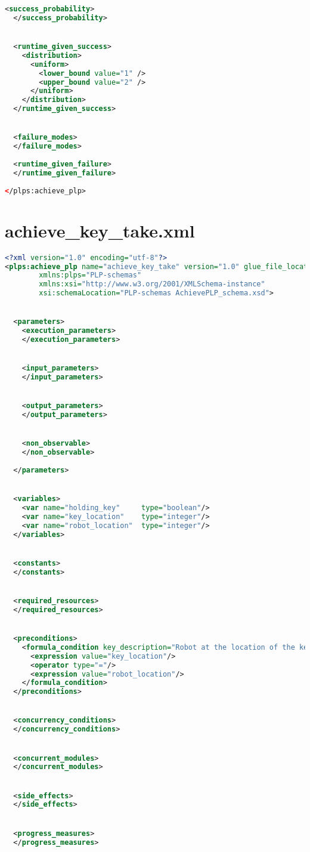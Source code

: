\begin{lstlisting}[style=stylexml,language=XML]
  <success_probability>
  </success_probability>


  <runtime_given_success>
    <distribution>
      <uniform>
        <lower_bound value="1" />
        <upper_bound value="2" />
      </uniform>
    </distribution>
  </runtime_given_success>


  <failure_modes>
  </failure_modes>
  
  <runtime_given_failure>
  </runtime_given_failure>
  
</plps:achieve_plp>
	\end{lstlisting}
\section{  achieve_key_take.xml}\label{Appendix_3_5} 
\begin{lstlisting}[style=stylexml,language=XML]
<?xml version="1.0" encoding="utf-8"?>
<plps:achieve_plp name="achieve_key_take" version="1.0" glue_file_location=""
        xmlns:plps="PLP-schemas"
        xmlns:xsi="http://www.w3.org/2001/XMLSchema-instance"
        xsi:schemaLocation="PLP-schemas AchievePLP_schema.xsd">


  <parameters>
    <execution_parameters>
    </execution_parameters>


    <input_parameters>
    </input_parameters>


    <output_parameters>
    </output_parameters>


    <non_observable>
    </non_observable>
    
  </parameters>


  <variables>
    <var name="holding_key"     type="boolean"/>
    <var name="key_location"    type="integer"/>
    <var name="robot_location"  type="integer"/>
  </variables>


  <constants>
  </constants>


  <required_resources>
  </required_resources>


  <preconditions>
    <formula_condition key_description="Robot at the location of the key">
      <expression value="key_location"/>
      <operator type="="/>
      <expression value="robot_location"/>
    </formula_condition>
  </preconditions>


  <concurrency_conditions>
  </concurrency_conditions>


  <concurrent_modules>
  </concurrent_modules>


  <side_effects>
  </side_effects>


  <progress_measures>
  </progress_measures>



\end{lstlisting}
